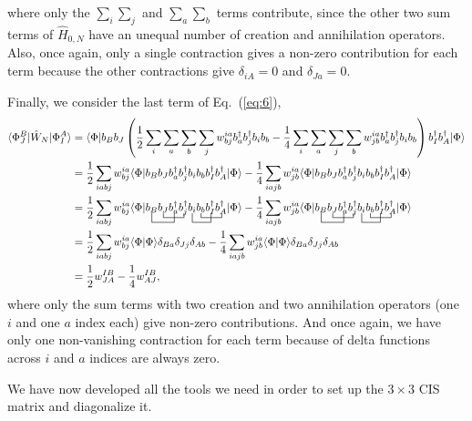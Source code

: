 \documentclass[a4paper]{article}
\newcommand{\eq} [1]{Eq.\ (\ref{eq:#1})}
\newcommand{\nn}{\nonumber}
\begin{document}
where only the $\sum_i\sum_j$ and $\sum_a\sum_b$ terms contribute, since the other two sum terms of $\hat{H}_{0,N}$ have an unequal number of creation and annihilation operators. Also, once again, only a single contraction gives a non-zero contribution for each term because the other contractions give $\delta_{iA}=0$ and $\delta_{Ja}=0$.

Finally, we consider the last term of \eq{6},
\begin{align}
\langle \Phi^B_J | \hat{W}_N | \Phi^A_I \rangle &= \langle \Phi |b_Bb_J \left( \frac{1}{2}\sum_i\sum_a\sum_b\sum_j w^{ia}_{bj}b_a^\dagger b_j^\dagger b_i b_b - \frac{1}{4}\sum_i\sum_a\sum_j\sum_b w^{ia}_{jb} b_a^\dagger b_j^\dagger b_i b_b\right) b_I^\dagger b_A^\dagger| \Phi \rangle \nn\\
&= \frac{1}{2}\sum_{iabj} w^{ia}_{bj} \langle \Phi |b_Bb_J b_a^\dagger b_j^\dagger b_i b_b b_I^\dagger b_A^\dagger| \Phi \rangle - \frac{1}{4}\sum_{iajb} w^{ia}_{jb}\langle \Phi |b_Bb_J b_a^\dagger b_j^\dagger b_i b_b b_I^\dagger b_A^\dagger| \Phi \rangle \nn\\
&= \frac{1}{2}\sum_{iabj} w^{ia}_{bj} \langle \Phi | \bcontraction[2ex]{}{b_B}{b_J}{b_a^\dagger}\bcontraction{b_B}{b_J}{b_a^\dagger}{b_j^\dagger}\bcontraction[2ex]{b_Bb_J b_a^\dagger b_j^\dagger}{b_i}{b_b}{b_I^\dagger}\bcontraction{b_Bb_J b_a^\dagger b_j^\dagger b_i}{b_b}{b_I^\dagger}{b_A^\dagger}b_Bb_J b_a^\dagger b_j^\dagger b_i b_b b_I^\dagger b_A^\dagger| \Phi \rangle - \frac{1}{4}\sum_{iajb} w^{ia}_{jb}\langle \Phi |\bcontraction[2ex]{}{b_B}{b_J}{b_a^\dagger}\bcontraction{b_B}{b_J}{b_a^\dagger}{b_j^\dagger}\bcontraction[2ex]{b_Bb_J b_a^\dagger b_j^\dagger}{b_i}{b_b}{b_I^\dagger}\bcontraction{b_Bb_J b_a^\dagger b_j^\dagger b_i}{b_b}{b_I^\dagger}{b_A^\dagger}b_Bb_J b_a^\dagger b_j^\dagger b_i b_b b_I^\dagger b_A^\dagger| \Phi \rangle \nn\\
&= \frac{1}{2}\sum_{iabj} w^{ia}_{bj} \langle \Phi | \Phi \rangle\delta_{Ba}\delta_{Jj}\delta_{Ab} - \frac{1}{4}\sum_{iajb} w^{ia}_{jb}\langle \Phi | \Phi \rangle\delta_{Ba}\delta_{Jj}\delta_{Ab} \nn\\ 
&= \frac{1}{2}w^{IB}_{JA} - \frac{1}{4}w^{IB}_{AJ},
\end{align}
where only the sum terms with two creation and two annihilation operators (one $i$ and one $a$ index each) give non-zero contributions. And once again, we have only one non-vanishing contraction for each term because of delta functions across $i$ and $a$ indices are always zero. 

We have now developed all the tools we need in order to set up the $3\times3$ CIS matrix and diagonalize it.
\end{document}
